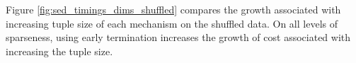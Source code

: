 Figure \ref{fig:sed_timings_dims_shuffled} compares the growth associated with increasing tuple size of each mechanism on the shuffled data.  On all levels of sparseness, using early termination increases the growth of cost associated with increasing the tuple size.
\begin{figure}
        \centering
        ~ 
        
         
        ~ 
        

\end{figure}
